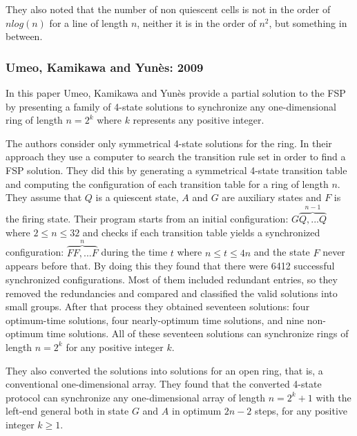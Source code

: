 \documentclass{article}
\begin{document}
They also noted that the number of non quiescent cells is not in the order of $n log(n)$ for a line of length $n$, neither it is in the order of $n^2$, but something in between.

\subsubsection{Umeo, Kamikawa and Yun\`{e}s: 2009}
In this paper Umeo, Kamikawa and Yun\`{e}s\cite{umeo2009family} provide a partial solution to the FSP by presenting a family of 4-state solutions to synchronize any one-dimensional ring of length $n = 2^k$ where $k$ represents any positive integer.

The authors consider only symmetrical 4-state solutions for the ring. In their approach they use a computer to search the transition rule set in order to find a FSP solution. They did this by generating a symmetrical 4-state transition table and computing the configuration of each transition table for a ring of length $n$. They assume that $Q$ is a quiescent state, $A$ and $G$ are auxiliary states and $F$ is the firing state. Their program starts from an initial configuration: $G\overbrace{Q,...Q}^{n-1}$ where $2 \le n \le 32$ and checks if each transition table yields a synchronized configuration: $\overbrace{FF,...F}^n$ during the time $t$ where $n \le t \le 4n$ and the state $F$ never appears before that. By doing this they found that there were 6412 successful synchronized configurations. Most of them included redundant entries, so they removed the redundancies and compared and classified the valid solutions into small groups. After that process they obtained seventeen solutions: four optimum-time solutions, four nearly-optimum time solutions, and nine non-optimum time solutions. All of these seventeen solutions can synchronize rings of length $n = 2^k$ for any positive integer $k$.

They also converted the solutions into solutions for an open ring, that is, a conventional one-dimensional array. They found that the converted 4-state protocol can synchronize any one-dimensional array of length $n = 2^k + 1$ with the left-end general both in state $G$ and $A$ in optimum $2n -2$ steps, for any positive integer $k \ge 1$.
\end{document}
